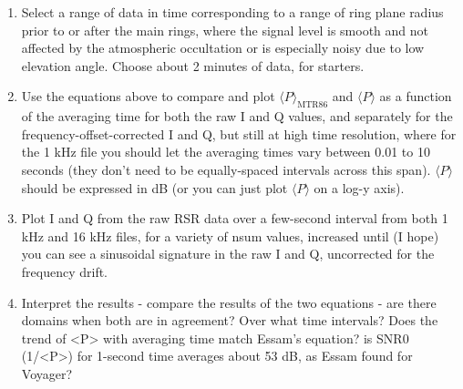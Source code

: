 \documentclass[crop=false,class=article,oneside]{standalone}
\begin{document}
\begin{enumerate}
    \item Select a range of data in time corresponding to a range of ring plane radius prior to or after the main rings, where the signal level is smooth and not affected by the atmospheric occultation or is especially noisy due to low elevation angle. Choose about 2 minutes of data, for starters.
    \item Use the equations above to compare and plot $\langle P\rangle_{\textrm{MTR86}}$ and $\langle P \rangle$ as a function of the averaging time for both the raw I and Q values, and separately for the frequency-offset-corrected I and Q, but still at high time resolution, where for the 1 kHz file you should let the averaging times vary between 0.01 to 10 seconds (they don't need to be equally-spaced intervals across this span). $\langle P \rangle$ should be expressed in dB (or you can just plot $\langle P \rangle$ on a log-y axis).
    \item Plot I and Q from the raw RSR data over a few-second interval from both 1 kHz and 16 kHz files, for a variety of nsum values, increased until (I hope) you can see a sinusoidal signature in the raw I and Q, uncorrected for the frequency drift.
    \item Interpret the results - compare the results of the two equations - are there domains when both are in agreement? Over what time intervals? Does the trend of <P> with averaging time match Essam's equation? is SNR0 (1/<P>) for 1-second time averages about 53 dB, as Essam found for Voyager?
\end{enumerate}
\end{document}
